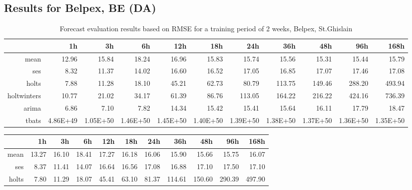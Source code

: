 \begin{landscape}

\subsection{Results for Belpex, BE (DA)} \label{ssec:app_tables_belpex}



\begin{table}[ht]
\centering
\vspace*{-0.2in}
\begin{tabular}{rrrrrrrrrrr}
  \hline
 & 1h & 3h & 6h & 12h & 18h & 24h & 36h & 48h & 96h & 168h \\ 
  \hline
mean & 12.96 & 15.84 & 18.24 & 16.96 & 15.83 & 15.74 & 15.56 & 15.31 & 15.44 & 15.79 \\ 
  ses & 8.32 & 11.37 & 14.02 & 16.60 & 16.52 & 17.05 & 16.85 & 17.07 & 17.46 & 17.08 \\ 
  holts & 7.88 & 11.28 & 18.10 & 45.21 & 62.73 & 80.79 & 113.75 & 149.46 & 288.20 & 493.94 \\ 
  holtwinters & 10.77 & 21.02 & 34.17 & 61.39 & 86.76 & 113.05 & 164.22 & 216.22 & 424.16 & 736.39 \\ 
  arima & 6.86 & 7.10 & 7.82 & 14.34 & 15.42 & 15.41 & 15.64 & 16.11 & 17.79 & 18.47 \\ 
  tbats & 4.86E+49 & 1.05E+50 & 1.46E+50 & 1.45E+50 & 1.40E+50 & 1.39E+50 & 1.38E+50 & 1.37E+50 & 1.36E+50 & 1.35E+50 \\ 
   \hline
\end{tabular}
\caption{Forecast evaluation results based on RMSE for a training period of 2 weeks, Belpex, St.Ghislain}
\label{tab:app_results_stghislain_2weeks}
\end{table}
\begin{table}[ht]
\centering
\vspace*{-0.1in}
\begin{tabular}{rrrrrrrrrrr}
  \hline
 & 1h & 3h & 6h & 12h & 18h & 24h & 36h & 48h & 96h & 168h \\ 
  \hline
mean & 13.27 & 16.10 & 18.41 & 17.27 & 16.18 & 16.06 & 15.90 & 15.66 & 15.75 & 16.07 \\ 
  ses & 8.37 & 11.41 & 14.07 & 16.64 & 16.56 & 17.08 & 16.88 & 17.10 & 17.50 & 17.10 \\ 
  holts & 7.80 & 11.29 & 18.07 & 45.41 & 63.10 & 81.37 & 114.61 & 150.60 & 290.39 & 497.90 \\ 

\end{tabular}
\end{table}
\end{landscape}
